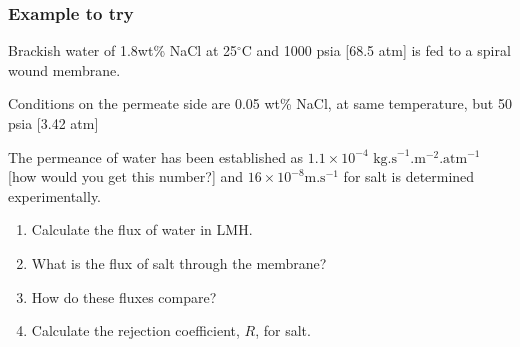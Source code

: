 \begin{frame}\frametitle{Example to try}
	Brackish water of 1.8wt\% NaCl at 25$^{\circ}\text{C}$ and 1000 psia [68.5 atm] is fed to a spiral wound membrane.

	\vspace{6pt}
	Conditions on the permeate side are 0.05 wt\% NaCl, at same temperature, but 50 psia [3.42 atm]

	\vspace{6pt}
	The permeance of water has been established as $1.1 \times 10^{-4} \text{~kg.s}^{-1}\text{.m}^{-2}\text{.atm}^{-1}$ [how would you get this number?] and $16 \times 10^{-8} \text{m.s}^{-1}$ for salt is determined experimentally.

	\begin{enumerate}
		\item	Calculate the flux of water in LMH.
		\item	What is the flux of salt through the membrane?
		\item	How do these fluxes compare?
		\item	Calculate the rejection coefficient, $R$, for salt.
	\end{enumerate}
	

\end{frame}

